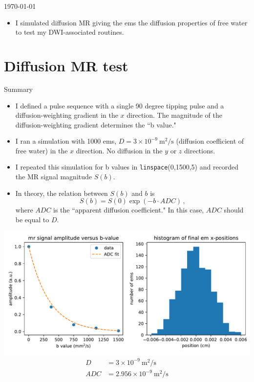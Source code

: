 \documentclass[dvipsnames]{beamer}
\begin{document}
\begin{frame}{\today}
\begin{itemize}
\item I simulated diffusion MR giving the ems the diffusion properties of free water to test my DWI-associated routines.
\end{itemize}
\end{frame}

\section{Diffusion MR test}

\begin{frame}{Summary}
\begin{itemize}
\item I defined a pulse sequence with a single 90 degree tipping pulse and a diffusion-weighting gradient in the $x$ direction. The magnitude of the diffusion-weighting gradient determines the ``b value."
\item I ran a simulation with 1000 ems, $D = 3 \times 10^{-9}~\mathrm{m^2/s}$ (diffusion coefficient of free water) in the $x$ direction. No diffusion in the $y$ or $z$ directions.
\item I repeated this simulation for b values in \texttt{linspace}(0,1500,5) and recorded the MR signal magnitude $S(b)$.
\item In theory, the relation between $S(b)$ and $b$ is
\begin{equation*}
S(b) = S(0)\exp(-b \cdot ADC)\,,
\end{equation*}
where $ADC$ is the ``apparent diffusion coefficient." In this case, $ADC$ should be equal to $D$.
\end{itemize}
\end{frame}

\begin{frame}
\begin{center}
\includegraphics[width=\textwidth]{mr-b_num-ems-1000}
\begin{equation*}
\begin{aligned}
D &= 3 \times 10^{-9}~\mathrm{m^2/s}\\
ADC &= 2.956 \times 10^{-9}~\mathrm{m^2/s}
\end{aligned}
\end{equation*}
\end{center}
\end{frame}
\end{document}
